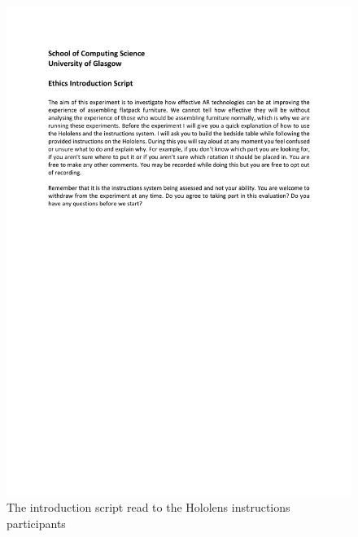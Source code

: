 \documentclass{l4proj}
\begin{document}
\begin{appendices}
\begin{figure}
    \centering
    \includegraphics[width=1\linewidth]{dissertation//images/introductionScriptHololens.pdf}
    \caption{The introduction script read to the Hololens instructions participants}
\end{figure}


\end{appendices}
\end{document}
